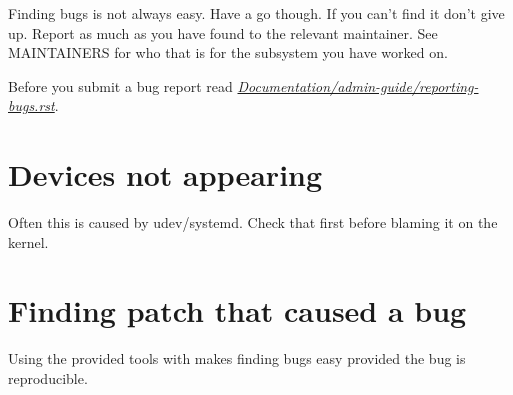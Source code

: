 \documentclass[a4paper,8pt,english]{sphinxmanual}
\begin{document}
Finding bugs is not always easy. Have a go though. If you can't find it don't
give up. Report as much as you have found to the relevant maintainer. See
MAINTAINERS for who that is for the subsystem you have worked on.

Before you submit a bug report read
{\hyperref[admin\string-guide/reporting\string-bugs:reportingbugs]{\emph{Documentation/admin-guide/reporting-bugs.rst}}}.


\section{Devices not appearing}
\label{admin-guide/bug-bisect:devices-not-appearing}
Often this is caused by udev/systemd. Check that first before blaming it
on the kernel.


\section{Finding patch that caused a bug}
\label{admin-guide/bug-bisect:finding-patch-that-caused-a-bug}
Using the provided tools with  makes finding bugs easy provided the bug
is reproducible.
\end{document}
